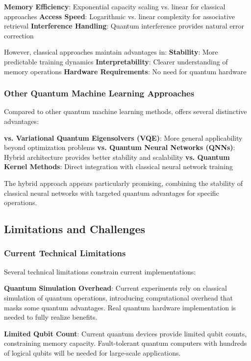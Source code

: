 \textbf{Memory Efficiency}: Exponential capacity scaling vs. linear for classical approaches
\textbf{Access Speed}: Logarithmic vs. linear complexity for associative retrieval
\textbf{Interference Handling}: Quantum interference provides natural error correction

However, classical approaches maintain advantages in:
\textbf{Stability}: More predictable training dynamics
\textbf{Interpretability}: Clearer understanding of memory operations
\textbf{Hardware Requirements}: No need for quantum hardware

\subsubsection{Other Quantum Machine Learning Approaches}

Compared to other quantum machine learning methods, \qmnn offers several distinctive advantages:

\textbf{vs. Variational Quantum Eigensolvers (VQE)}: More general applicability beyond optimization problems
\textbf{vs. Quantum Neural Networks (QNNs)}: Hybrid architecture provides better stability and scalability
\textbf{vs. Quantum Kernel Methods}: Direct integration with classical neural network training

The hybrid approach appears particularly promising, combining the stability of classical neural networks with targeted quantum advantages for specific operations.

\subsection{Limitations and Challenges}

\subsubsection{Current Technical Limitations}

Several technical limitations constrain current \qmnn implementations:

\textbf{Quantum Simulation Overhead}: Current experiments rely on classical simulation of quantum operations, introducing computational overhead that masks some quantum advantages. Real quantum hardware implementation is needed to fully realize benefits.

\textbf{Limited Qubit Count}: Current quantum devices provide limited qubit counts, constraining memory capacity. Fault-tolerant quantum computers with hundreds of logical qubits will be needed for large-scale applications.

